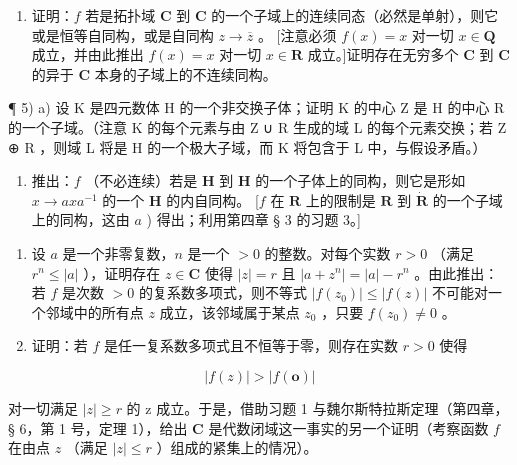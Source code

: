 \begin{enumerate}
\def\labelenumi{\arabic{enumi})}
\setcounter{enumi}{3}
\tightlist
\item
  证明：\(f\) 若是拓扑域 \(\mathbf{C}\) 到 \(\mathbf{C}\) 的一个子域上的连续同态（必然是单射），则它或是恒等自同构，或是自同构 \(z \to \overline{z}\) 。 {[}注意必须 \(f(x) = x\) 对一切 \(x \in \mathbf{Q}\) 成立，并由此推出 \(f(x) = x\) 对一切 \(x \in \mathbf{R}\) 成立。{]}证明存在无穷多个 \(\mathbf{C}\) 到 \(\mathbf{C}\) 的异于 \(\mathbf{C}\) 本身的子域上的不连续同构。
\end{enumerate}

¶ 5) a) 设 K 是四元数体 H 的一个非交换子体；证明 K 的中心 Z 是 H 的中心 R 的一个子域。（注意 K 的每个元素与由 Z ∪ R 生成的域 L 的每个元素交换；若 Z ⊕ R ，则域 L 将是 H 的一个极大子域，而 K 将包含于 L 中，与假设矛盾。）

\begin{enumerate}
\def\labelenumi{\alph{enumi})}
\setcounter{enumi}{1}
\tightlist
\item
  推出：\(f\) （不必连续）若是 \(\mathbf{H}\) 到 \(\mathbf{H}\) 的一个子体上的同构，则它是形如 \(x \to axa^{-1}\) 的一个 \(\mathbf{H}\) 的内自同构。 {[}\(f\) 在 \(\mathbf{R}\) 上的限制是 \(\mathbf{R}\) 到 \(\dot{\mathbf{R}}\) 的一个子域上的同构，这由 \(a\) ) 得出；利用第四章 § 3 的习题 3。{]}
\end{enumerate}

\ExerciseSection

\begin{enumerate}
\def\labelenumi{\arabic{enumi})}
\item
  设 \(a\) 是一个非零复数，\(n\) 是一个 \(>0\) 的整数。对每个实数 \(r > 0\) （满足 \(r^n \leqslant |a|\) ），证明存在 \(z \in \mathbf{C}\) 使得 \(|z| = r\) 且 \(|a + z^n| = |a| - r^n\) 。由此推出：若 \(f\) 是次数 \(>0\) 的复系数多项式，则不等式 \(|f(z_0)| \leqslant |f(z)|\) 不可能对一个邻域中的所有点 \(z\) 成立，该邻域属于某点 \(z_0\) ，只要 \(f(z_0) \neq 0\) 。
\item
  证明：若 \(f\) 是任一复系数多项式且不恒等于零，则存在实数 \(r > 0\) 使得
\end{enumerate}

\[
\left| f (z) \right| > \left| f (\mathbf {o}) \right|
\]

对一切满足 \(|z| \geqslant r\) 的 z 成立。于是，借助习题 1 与魏尔斯特拉斯定理（第四章，§ 6，第 1 号，定理 1），给出 \(\mathbf{C}\) 是代数闭域这一事实的另一个证明（考察函数 \(f\) 在由点 \(z\) （满足 \(|z| \leqslant r\) ）组成的紧集上的情况）。

